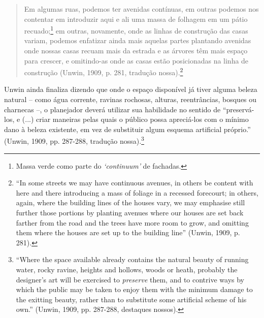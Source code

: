 \documentclass[12pt, a4paper]{book} %
\begin{document}
        \begin{quotation}
            Em algumas ruas, podemos ter avenidas contínuas, em outras podemos nos contentar em introduzir aqui e ali uma massa de folhagem em um pátio recuado;\footnote[89]{Massa verde como parte do \textit{`continuum'} de fachadas.} em outras, novamente, onde as linhas de construção das casas variam, podemos enfatizar ainda mais aquelas partes plantando avenidas onde nossas casas recuam mais da estrada e as árvores têm mais espaço para crescer, e omitindo-as onde as casas estão posicionadas na linha de construção (Unwin, 1909, p. 281, tradução nossa).\footnote[90]{``In some streets we may have continuous avenues, in others be content with here and there introducing a mass of foliage in a recessed forecourt; in others, again, where the building lines of the houses vary, we may emphasise still further those portions by planting avenues where our houses are set back farther from the road and the trees have more room to grow, and omitting them where the houses are set up to the building line'' (Unwin, 1909, p. 281).}
        \end{quotation}

        Unwin ainda finaliza dizendo que onde o espaço disponível já tiver alguma beleza natural – como água corrente, ravinas rochosas, alturas, reentrâncias, bosques ou charnecas –, o planejador deverá utilizar sua habilidade no sentido de ``preservá-los, e (...) criar maneiras pelas quais o público possa apreciá-los com o mínimo dano à beleza existente, em vez de substituir algum esquema artificial próprio.'' (Unwin, 1909, pp. 287-288, tradução nossa).\footnote[91]{``Where the space available already contains the natural beauty of running water, rocky ravine, heights and hollows, woods or heath, probably the designer's art will be exercised to \textit{preserve} them, and to contrive ways by which the public may be taken to enjoy them with the minimum damage to the exitting beauty, rather than to substitute some artificial scheme of his own.'' (Unwin, 1909, pp. 287-288, destaques nossos).}
\end{document}
